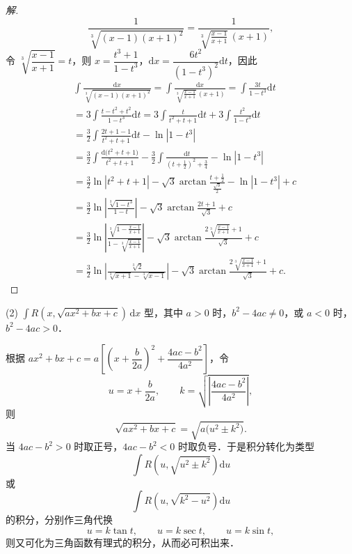 \begin{proof}[解]
\[
\frac{1}{\sqrt[3]{(x-1)(x+1)^{2}}} = \frac{1}{\sqrt[3]{\frac{x-1}{x+1}}\,(x+1)},
\]
令 $\sqrt[3]{\dfrac{x-1}{x+1}} = t$，则 $x = \dfrac{t^{3}+1}{1-t^{3}}$，$\mathrm{d}x = \dfrac{6t^{2}}{\left(1-t^{3}\right)^{2}}\mathrm{d}t$，因此
\[
\begin{aligned}
&\int\frac{\mathrm{d}x}{\sqrt[3]{(x-1)(x+1)^{2}}}
= \int\frac{\mathrm{d}x}{\sqrt[3]{\frac{x-1}{x+1}}\,(x+1)}
= \int\frac{3t}{1-t^{3}}\mathrm{d}t\\
&= 3\int\frac{t-t^{2}+t^{2}}{1-t^{3}}\mathrm{d}t
= 3\int\frac{t}{t^{2}+t+1}\mathrm{d}t+3\int\frac{t^{2}}{1-t^{3}}\mathrm{d}t\\
&= \frac{3}{2}\int\frac{2t+1-1}{t^{2}+t+1}\mathrm{d}t-\ln\left|1-t^{3}\right|\\
&= \frac{3}{2}\int\frac{\mathrm{d}\big(t^{2}+t+1\big)}{t^{2}+t+1}
-\frac{3}{2}\int\frac{\mathrm{d}t}{\left(t+\frac{1}{2}\right)^{2}+\frac{3}{4}}-\ln\left|1-t^{3}\right|\\
&= \frac{3}{2}\ln\left|t^{2}+t+1\right|-\sqrt{3}\arctan\frac{t+\frac{1}{2}}{\frac{\sqrt{3}}{2}}-\ln\left|1-t^{3}\right|+c\\
&= \frac{3}{2}\ln\left|\frac{\sqrt[3]{1-t^{3}}}{1-t}\right|-\sqrt{3}\arctan\frac{2t+1}{\sqrt{3}}+c\\
&= \frac{3}{2}\ln\left|\frac{\sqrt[3]{1-\frac{x-1}{x+1}}}{1-\sqrt[3]{\frac{x-1}{x+1}}}\right|-\sqrt{3}\arctan\frac{2\sqrt[3]{\frac{x-1}{x+1}}+1}{\sqrt{3}}+c\\
&= \frac{3}{2}\ln\left|\frac{\sqrt[3]{2}}{\sqrt[3]{x+1}-\sqrt[3]{x-1}}\right|-\sqrt{3}\arctan\frac{2\sqrt[3]{\frac{x-1}{x+1}}+1}{\sqrt{3}}+c.
\end{aligned}
\]
\end{proof}

(2) $\displaystyle\int R(x,\sqrt{ax^{2}+bx+c})\,\mathrm{d}x$ 型，其中 $a > 0$ 时，$b^{2}-4ac \neq 0$，或 $a < 0$ 时，$b^{2}-4ac > 0$．

根据 $ax^{2}+bx+c = a\left[\left(x+\dfrac{b}{2a}\right)^{2}+\dfrac{4ac-b^{2}}{4a^{2}}\right]$，令
\[
u = x+\frac{b}{2a},\qquad k = \sqrt{\left|\frac{4ac-b^{2}}{4a^{2}}\right|},
\]
则
\[
\sqrt{ax^{2}+bx+c} = \sqrt{a\big(u^{2}\pm k^{2}\big)}.
\]
当 $4ac-b^{2} > 0$ 时取正号，$4ac-b^{2} < 0$ 时取负号．于是积分转化为类型
\[
\int R\left(u,\sqrt{u^{2}\pm k^{2}}\right)\mathrm{d}u
\]
或
\[
\int R\left(u,\sqrt{k^{2}-u^{2}}\right)\mathrm{d}u
\]
的积分，分别作三角代换
\[
u = k\tan t,\qquad u = k\sec t,\qquad u = k\sin t,
\]
则又可化为三角函数有理式的积分，从而必可积出来．

